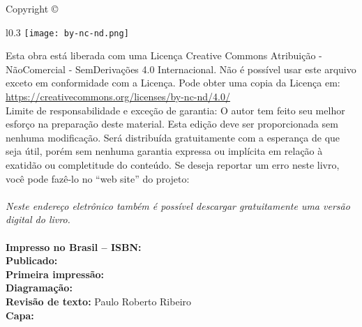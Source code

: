 
\newpage
\thispagestyle{empty}

\noindent Copyright \copyright\ \imprimiryear\ \myauthor\\ %

\begin{wrapfigure}{l}{0.3\textwidth}
\texttt{[image: by-nc-nd.png]}
\end{wrapfigure}
\noindent Esta obra está liberada com uma Licença 
Creative Commons Atribuição - NãoComercial - SemDerivações 4.0 Internacional.
Não é possível usar este arquivo exceto em conformidade com a Licença. 
Pode obter uma copia da Licença em:\\
\url{https://creativecommons.org/licenses/by-nc-nd/4.0/}\\ %


\noindent Limite de responsabilidade e exceção de garantia: O autor tem feito
seu melhor esforço na preparação deste material.
Esta edição deve ser proporcionada sem nenhuma modificação. 
Será distribuída gratuitamente com a esperança de que seja útil, 
porém sem nenhuma garantia expressa ou implícita em relação à exatidão ou completitude do conteúdo.
Se deseja reportar um erro neste livro, você pode fazê-lo no 
``web site'' do projeto:\\ \ImprimirLinkHomePageLivro\\
\noindent \textit{Neste endereço eletrônico também 
é possível descargar gratuitamente uma versão digital do livro.}\\

~\\

\noindent \textbf{Impresso no Brasil -- ISBN:} \imprimirisbn\\ %
\noindent \textbf{Publicado:} \imprimireditora\\ %
\noindent \textbf{Primeira impressão:} \imprimiryear\\ %
\noindent \textbf{Diagramação:} \myauthor\\ %
\noindent \textbf{Revisão de texto:} Paulo Roberto Ribeiro\\ %
\noindent \textbf{Capa:} \myauthor\\ %
~\\

\vfill

